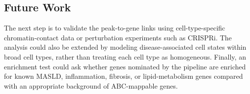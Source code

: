 \documentclass[11pt]{article}
\begin{document}
  \subsection{Future Work}\label{subsec:future-work}
  The next step is to validate the peak-to-gene links using cell-type-specific chromatin-contact data or perturbation experiments such as CRISPRi. The analysis could also be extended by modeling disease-associated cell states within broad cell types, rather than treating each cell type as homogeneous. Finally, an enrichment test could ask whether genes nominated by the pipeline are enriched for known MASLD, inflammation, fibrosis, or lipid-metabolism genes compared with an appropriate background of ABC-mappable genes.

  \FloatBarrier
  \newpage

  
  
\end{document}
